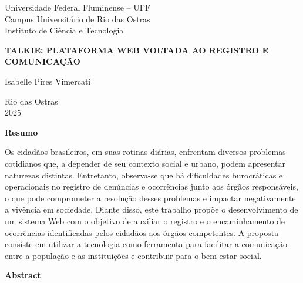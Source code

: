 \documentclass[12pt,a4paper]{article}
\begin{document}
\begin{titlepage}
\centering

{\small
Universidade Federal Fluminense -- UFF\\
Campus Universitário de Rio das Ostras\\
Instituto de Ciência e Tecnologia
}

\vspace{8cm}


{\bfseries
\MakeUppercase{Talkie: Plataforma Web Voltada ao Registro e Comunicação}
}

\vspace{8cm}

{\normalsize
Isabelle Pires Vimercati
}

\vfill

Rio das Ostras\\
2025

\end{titlepage}

\clearpage




\clearpage

\begin{center}
\textbf{\Large Resumo}
\end{center}


Os cidadãos brasileiros, em suas rotinas diárias, enfrentam diversos problemas
cotidianos que, a depender de seu contexto social e urbano, podem apresentar
naturezas distintas. Entretanto, observa-se que há dificuldades burocráticas e
operacionais no registro de denúncias e ocorrências junto aos órgãos responsáveis,
o que pode comprometer a resolução desses problemas e impactar negativamente a
vivência em sociedade. Diante disso, este trabalho propõe o desenvolvimento de um
sistema Web com o objetivo de auxiliar o registro e o encaminhamento de ocorrências
identificadas pelos cidadãos aos órgãos competentes. A proposta consiste em utilizar
a tecnologia como ferramenta para facilitar a comunicação entre a população e as
instituições e contribuir para o bem-estar social.

\clearpage

\begin{center}
\textbf{\Large Abstract}
\end{center}
\end{document}

